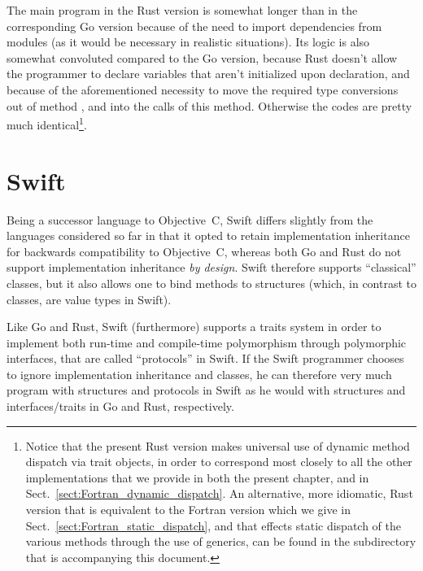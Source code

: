 \documentclass[11pt,oneside]{report}
\newcommand{\code}[1]{{\selectfont\ttfamily{#1}}}
\begin{document}
The main program in the Rust version is somewhat longer than in the
corresponding Go version because of the need to import dependencies
from modules (as it would be necessary in realistic situations). Its
logic is also somewhat convoluted compared to the Go version, because
Rust doesn't allow the programmer to declare variables that aren't
initialized upon declaration, and because of the aforementioned
necessity to move the required type conversions out of method
\code{average}, and into the calls of this method. Otherwise the codes
are pretty much identical\footnote{Notice that the present Rust
version makes universal use of dynamic method dispatch via trait
objects, in order to correspond most closely to all the other
implementations that we provide in both the present chapter, and in
Sect.~\ref{sect:Fortran_dynamic_dispatch}. An alternative, more
idiomatic, Rust version that is equivalent to the Fortran version
which we give in Sect.~\ref{sect:Fortran_static_dispatch}, and that
effects static dispatch of the various \code{sum} methods through the
use of generics, can be found in the \code{Code} subdirectory that is
accompanying this document.}.


\section{Swift}
\label{sect:Swift}

Being a successor language to Objective~C, Swift differs slightly from
the languages considered so far in that it opted to retain
implementation inheritance for backwards compatibility to Objective~C,
whereas both Go and Rust do not support implementation inheritance
\emph{by design}. Swift therefore supports ``classical'' classes, but
it also allows one to bind methods to structures (which, in contrast
to classes, are value types in Swift).

Like Go and Rust, Swift (furthermore) supports a traits system in order
to implement both run-time and compile-time polymorphism through
polymorphic interfaces, that are called ``protocols'' in Swift. If the
Swift programmer chooses to ignore implementation inheritance and
classes, he can therefore very much program with structures and
protocols in Swift as he would with structures and interfaces/traits
in Go and Rust, respectively.
\end{document}
